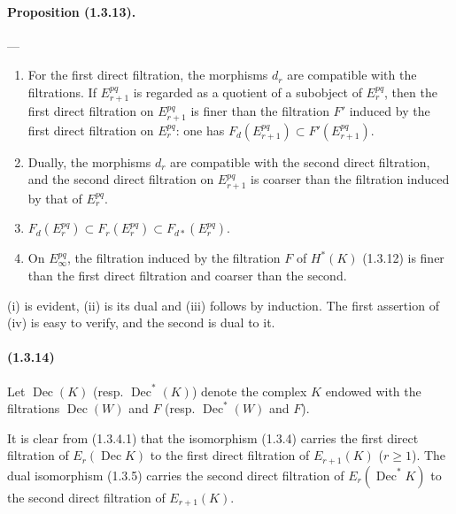 \documentclass[10pt]{article}
\newcommand{\Dec}{\operatorname{Dec}}
\begin{document}
\paragraph{Proposition (1.3.13).} ---
\begin{enumerate}[label=(\roman*)]
\item For the first direct filtration, the morphisms $d_r$ are compatible with the filtrations. If $E_{r+1}^{pq}$ is regarded as a quotient of a subobject of $E_r^{pq}$, then the first direct filtration on $E_{r+1}^{pq}$ is finer than the filtration $F'$ induced by the first direct filtration on $E_r^{pq}$: one has $F_d(E_{r+1}^{pq})\subset F'(E_{r+1}^{pq})$.
\item Dually, the morphisms $d_r$ are compatible with the second direct filtration, and the second direct filtration on $E_{r+1}^{pq}$ is coarser than the filtration induced by that of $E_r^{pq}$.
\item $F_d(E_r^{pq})\subset F_r(E_r^{pq})\subset F_{d*}(E_r^{pq})$.
\item On $E_\infty^{pq}$, the filtration induced by the filtration $F$ of $H^*(K)$ (1.3.12) is finer than the first direct filtration and coarser than the second.
\end{enumerate}
(i) is evident, (ii) is its dual and (iii) follows by induction. The first assertion of (iv) is easy to verify, and the second is dual to it.

\paragraph{(1.3.14)} Let $\Dec(K)$ (resp. $\Dec^*(K)$) denote the complex $K$ endowed with the filtrations $\Dec(W)$ and $F$ (resp. $\Dec^*(W)$ and $F$).

It is clear from (1.3.4.1) that the isomorphism (1.3.4) carries the first direct filtration of $E_r(\Dec K)$ to the first direct filtration of $E_{r+1}(K)$ ($r\ge1$). The dual isomorphism (1.3.5) carries the second direct filtration of $E_r(\Dec^*K)$ to the second direct filtration of $E_{r+1}(K)$.
\end{document}
